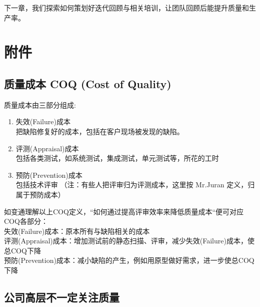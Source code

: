下一章，我们探索如何策划好迭代回顾与相关培训，让团队回顾后能提升质量和生产率。

\hypertarget{ux9644ux4ef6}{%
\section{附件}\label{ux9644ux4ef6}}

\hypertarget{ux8d28ux91cfux6210ux672c-coq-cost-of-quality}{%
\subsection{质量成本 COQ (Cost of
Quality)}\label{ux8d28ux91cfux6210ux672c-coq-cost-of-quality}}

质量成本由三部分组成:

\begin{enumerate}
\tightlist
\item
  失效(Failure)成本\\
  把缺陷修复好的成本，包括在客户现场被发现的缺陷。
\item
  评测(Appraisal)成本\\
  包括各类测试，如系统测试，集成测试，单元测试等，所花的工时
\item
  预防(Prevention)成本\\
  包括技术评审 （注：有些人把评审归为评测成本，这里按 Mr.Juran
  定义，归属于预防成本）
\end{enumerate}

如变通理解以上COQ定义，``如何通过提高评审效率来降低质量成本``便可对应COQ各部分：\\
失效(Failure)成本：原本所有与缺陷相关的成本\\
评测(Appraisal)成本：增加测试前的静态扫描、评审，减少失效(Failure)成本，使总COQ下降\\
预防(Prevention)成本：减小缺陷的产生，例如用原型做好需求，进一步使总COQ下降\\

\hypertarget{ux516cux53f8ux9ad8ux5c42ux4e0dux4e00ux5b9aux5173ux6ce8ux8d28ux91cf}{%
\subsection{公司高层不一定关注质量}\label{ux516cux53f8ux9ad8ux5c42ux4e0dux4e00ux5b9aux5173ux6ce8ux8d28ux91cf}}

